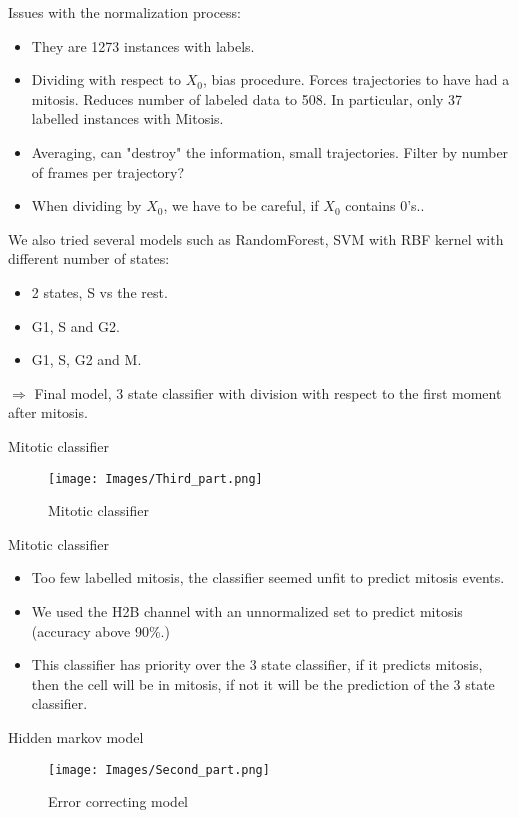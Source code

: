 \documentclass{beamer}
\begin{document}
\begin{frame}{Issues with the normalization process:}
\begin{itemize}
\item They are 1273 instances with labels.
\item Dividing with respect to $X_0$, bias procedure. Forces trajectories to have had a mitosis. Reduces number of labeled data to 508. In particular, only 37 labelled instances with Mitosis.
\item Averaging, can "destroy" the information, small trajectories. Filter by number of frames per trajectory? 
\item When dividing by $X_0$, we have to be careful, if $X_0$ contains 0's..
\end{itemize}
We also tried several models such as RandomForest, SVM with RBF kernel with different number of states:
\begin{itemize}
\item 2 states, S vs the rest.
\item G1, S and G2.
\item G1, S, G2 and M.
\end{itemize}
$\Longrightarrow$ Final model, 3 state classifier with division with respect to the first moment after mitosis.
 \end{frame}
 
\begin{frame}{Mitotic classifier}
\begin{figure}[!ht]
\centering
\texttt{[image: Images/Third\_part.png]}
\caption{Mitotic classifier}
\label{Mitotic classifier}
\end{figure}
\end{frame}

\begin{frame}{Mitotic classifier}
\begin{itemize}
\item Too few labelled mitosis, the classifier seemed unfit to predict mitosis events. 
\item We used the H2B channel with an unnormalized set to predict mitosis (accuracy above 90\%.) 
\item This classifier has priority over the 3 state classifier, if it predicts mitosis, then the cell will be in mitosis, if not it will be the prediction of the 3 state classifier.
\end{itemize}
\end{frame}


\begin{frame}{Hidden markov model}
\begin{figure}[!ht]
\centering
\texttt{[image: Images/Second\_part.png]}
\caption{Error correcting model}
\label{HMM_error}
\end{figure}
\end{frame}
\end{document}
